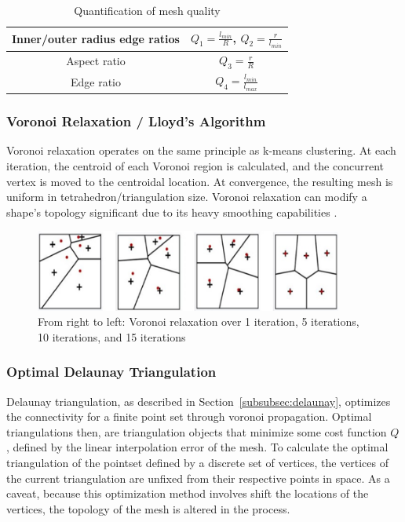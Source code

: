 \documentclass[12pt]{drexelthesis}
\let\Oldsubsubsection\subsubsection
\renewcommand{\subsubsection}{\FloatBarrier\Oldsubsubsection}
\begin{document}
\begin{table}[!ht]
	\centering
		\caption{Quantification of mesh quality}
		\begin{tabular}{| c | c |}
			\hline
			Inner/outer radius edge ratios & $Q_{1} = \frac{l_{min}}{R}$, $Q_{2} = \frac{r}{l_{min}}$
			\\ \hline
			Aspect ratio & $Q_{3} = \frac{r}{R}$
			\\ \hline
			Edge ratio & $Q_{4} = \frac{l_{min}}{l_{max}}$
			\\ \hline
		\end{tabular}
		\label{table:meshquality}
\end{table}


\subsubsection{Voronoi Relaxation / Lloyd's Algorithm}
\label{optimization:voronoirelaxation}

Voronoi  relaxation  operates  on  the  same  principle  as  k-means  clustering.  At  each  iteration,  the  centroid  of  each  Voronoi  region  is  calculated,  and  the  concurrent  vertex  is  moved  to  the  centroidal  location.  At  convergence,  the  resulting  mesh  is  uniform  in  tetrahedron/triangulation  size.  Voronoi  relaxation  can  modify  a  shape’s  topology  significant  due  to  its  heavy  smoothing  capabilities  \cite{RN61}.

\begin{figure}[!ht]
	\centering
		\includegraphics[width=4in]{voronoirelaxation.PNG}
		\caption[Demonstration of voronoi relaxation over several iterations]
		{\centering From right to left: Voronoi relaxation over 1 iteration, 5 iterations, 10 iterations, and 15 iterations}
		\label{fig:voronoirelaxation}
\end{figure}

\subsubsection{Optimal Delaunay Triangulation}
Delaunay triangulation, as described in Section~\ref{subsubsec:delaunay}, optimizes the connectivity for a finite point set through voronoi propagation. Optimal triangulations then, are triangulation objects that minimize some cost function $Q$, defined by the linear interpolation error of the mesh. To calculate the optimal triangulation of the pointset defined by a discrete set of vertices, the vertices of the current triangulation are unfixed from their respective points in space. As a caveat, because this optimization method involves shift the locations of the vertices, the topology of the mesh is altered in the process.
\end{document}
